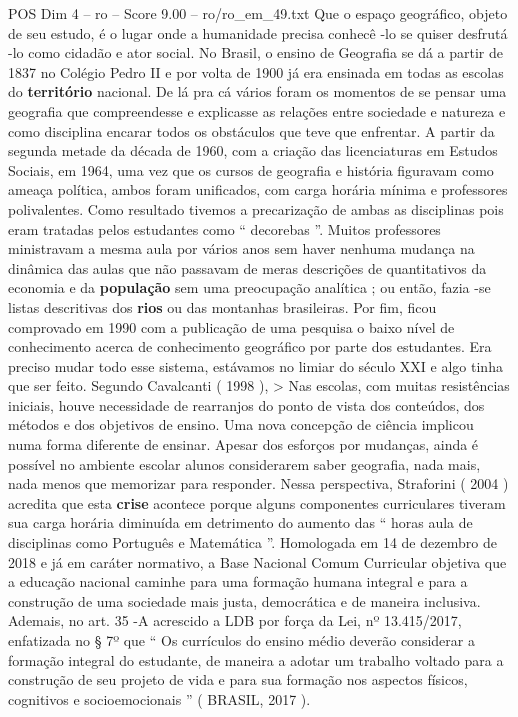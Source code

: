 \begin{textsample}{POS Dim 4 – ro – Score 9.00 – ro/ro\_em\_49.txt}
Que o espaço geográfico, objeto de seu estudo, é o lugar onde a humanidade precisa conhecê -lo se quiser desfrutá -lo como cidadão e ator social.
No Brasil, o ensino de Geografia se dá a partir de 1837 no Colégio Pedro II e por volta de 1900 já era ensinada em todas as escolas do \textbf{território} nacional.
De lá pra cá vários foram os momentos de se pensar uma geografia que compreendesse e explicasse as relações entre sociedade e natureza e como disciplina encarar todos os obstáculos que teve que enfrentar.
A partir da segunda metade da década de 1960, com a criação das licenciaturas em Estudos Sociais, em 1964, uma vez que os cursos de geografia e história figuravam como ameaça política, ambos foram unificados, com carga horária mínima e professores polivalentes.
Como resultado tivemos a precarização de ambas as disciplinas pois eram tratadas pelos estudantes como “ decorebas ”.
Muitos professores ministravam a mesma aula por vários anos sem haver nenhuma mudança na dinâmica das aulas que não passavam de meras descrições de quantitativos da economia e da \textbf{população} sem uma preocupação analítica ; ou então, fazia -se listas descritivas dos \textbf{rios} ou das montanhas brasileiras.
Por fim, ficou comprovado em 1990 com a publicação de uma pesquisa o baixo nível de conhecimento acerca de conhecimento geográfico por parte dos estudantes.
Era preciso mudar todo esse sistema, estávamos no limiar do século XXI e algo tinha que ser feito.
Segundo Cavalcanti ( 1998 ), > Nas escolas, com muitas resistências iniciais, houve necessidade de rearranjos do ponto de vista dos conteúdos, dos métodos e dos objetivos de ensino.
Uma nova concepção de ciência implicou numa forma diferente de ensinar.
Apesar dos esforços por mudanças, ainda é possível no ambiente escolar alunos considerarem saber geografia, nada mais, nada menos que memorizar para responder.
Nessa perspectiva, Straforini ( 2004 ) acredita que esta \textbf{crise} acontece porque alguns componentes curriculares tiveram sua carga horária diminuída em detrimento do aumento das “ horas aula de disciplinas como Português e Matemática ”.
Homologada em 14 de dezembro de 2018 e já em caráter normativo, a Base Nacional Comum Curricular objetiva que a educação nacional caminhe para uma formação humana integral e para a construção de uma sociedade mais justa, democrática e de maneira inclusiva.
Ademais, no art. 35 -A acrescido a LDB por força da Lei, nº 13.415/2017, enfatizada no § 7º que “ Os currículos do ensino médio deverão considerar a formação integral do estudante, de maneira a adotar um trabalho voltado para a construção de seu projeto de vida e para sua formação nos aspectos físicos, cognitivos e socioemocionais ” ( BRASIL, 2017 ).

\end{textsample}

